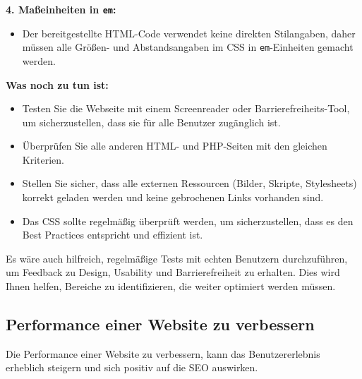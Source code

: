 \documentclass[12pt,a4paper]{scrartcl}
\newcommand{\tightlist}{
  \setlength{\itemsep}{0pt}\setlength{\parskip}{0pt}
}
\begin{document}
\textbf{4. Maßeinheiten in {\lstinline!em!}:}

\begin{itemize}
\tightlist
\item
  Der bereitgestellte HTML-Code verwendet keine direkten Stilangaben,
  daher müssen alle Größen- und Abstandsangaben im CSS in
  {\lstinline!em!}-Einheiten gemacht werden.
\end{itemize}

\textbf{Was noch zu tun ist:}

\begin{itemize}
\tightlist
\item
  Testen Sie die Webseite mit einem Screenreader oder
  Barrierefreiheits-Tool, um sicherzustellen, dass sie für alle Benutzer
  zugänglich ist.
\item
  Überprüfen Sie alle anderen HTML- und PHP-Seiten mit den gleichen
  Kriterien.
\item
  Stellen Sie sicher, dass alle externen Ressourcen (Bilder, Skripte,
  Stylesheets) korrekt geladen werden und keine gebrochenen Links
  vorhanden sind.
\item
  Das CSS sollte regelmäßig überprüft werden, um sicherzustellen, dass
  es den Best Practices entspricht und effizient ist.
\end{itemize}

Es wäre auch hilfreich, regelmäßige Tests mit echten Benutzern
durchzuführen, um Feedback zu Design, Usability und Barrierefreiheit zu
erhalten. Dies wird Ihnen helfen, Bereiche zu identifizieren, die weiter
optimiert werden müssen.

\hypertarget{performance-einer-website-zu-verbessern}{%
\subsection{Performance einer Website zu
verbessern}\label{performance-einer-website-zu-verbessern}}

Die Performance einer Website zu verbessern, kann das Benutzererlebnis
erheblich steigern und sich positiv auf die SEO auswirken.
\end{document}
